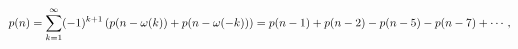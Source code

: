 \[\mathop{p\/}\nolimits\!\left(n\right)=\sum_{k=1}^{\infty}(-1)^{k+1}\left(%
\mathop{p\/}\nolimits\!\left(n-\omega(k)\right)+\mathop{p\/}\nolimits\!\left(n%
-\omega(-k)\right)\right)=\mathop{p\/}\nolimits\!\left(n-1\right)+\mathop{p\/}%
\nolimits\!\left(n-2\right)-\mathop{p\/}\nolimits\!\left(n-5\right)-\mathop{p%
\/}\nolimits\!\left(n-7\right)+\cdots,\]